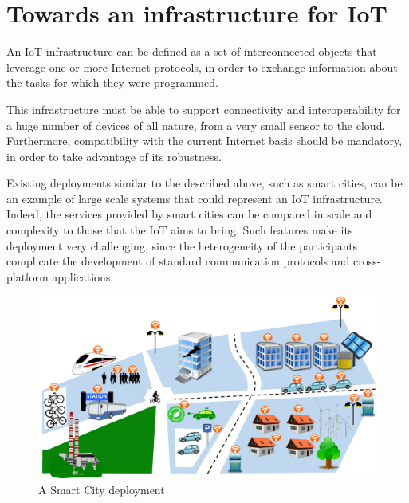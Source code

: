 \section{Towards an infrastructure for IoT}
\label{sec:IoTInfra}
An IoT infrastructure can be defined as a set of interconnected objects that leverage one or more Internet protocols, in order to exchange information about the tasks for which they were programmed.

This infrastructure must be able to support connectivity and interoperability for a huge number of devices of all nature, from a very small sensor to the cloud.
Furthermore, compatibility with the current Internet basis should be mandatory, in order to take advantage of its robustness.

Existing deployments similar to the described above, such as smart cities, can be an example of large scale systems that could represent an IoT infrastructure.
Indeed, the services provided by smart cities can be compared in scale and complexity to those that the IoT aims to bring.
Such features make its deployment very challenging, since the heterogeneity of the participants complicate the development of standard communication protocols and cross-platform applications.

\begin{figure}[htb]
	\centering
	\includegraphics[width=1\columnwidth]{chapters/background.images/SmartCity_comm.pdf}
	\caption{A Smart City deployment}
	\label{fig:SmartCity}
\end{figure}

